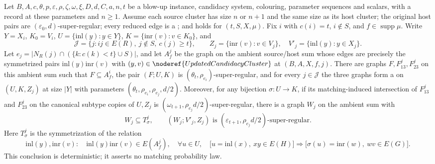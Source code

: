 \begin{lemma}
Let $B,A,c,\theta,p,\varepsilon,\rho,\zeta,\omega,\xi,D,d,C,a,n,t$
be a blow-up instance, candidacy system, colouring, parameter sequences and
scalars, with a  record at these parameters
and $n\ge1$. Assume each source cluster has size $n$ or $n+1$ and the same
size as its host cluster; the original host pairs are
$(\varepsilon_0,d)$-super-regular; every reduced edge is a
; and
 holds for $(t,S,X,\mu)$.
Fix $i$ with $c(i)=t$, $i\notin S$, and $f\in\operatorname{supp}\mu$.
Write $Y=X_i$, $K_0=V_i$, $U=\{\mathrm{inl}(y):y\in Y\}$,
$K=\{\mathrm{inr}(v):v\in K_0\}$, and
\[
 \mathcal J=\{j:ij\in E(R),\ j\notin S,\ c(j)\ge t\},\qquad
 Z_j=\{\mathrm{inr}(v):v\in V_j\},\quad
 V'_j=\{\mathrm{inl}(y):y\in X_j\}.
\]
Let $e_j=|N_R(j)\cap(\{k:c(k)<t\}\cup S)|$, and let $A_f^j$ be
the graph on the ambient source/host sum whose edges are precisely the
symmetrized pairs $\mathrm{inl}(y)\mathrm{inr}(v)$ with
$(y,v)\in\noderef{UpdatedCandidacyCluster}$ at $(B,A,X,f,j)$.
There are graphs $F,F_{13}^j,F_{23}^j$ on this ambient sum such that
$F\subseteq A_f^i$, the pair $(F;U,K)$ is
$(\theta_t,\rho_{e_i})$-super-regular, and for every $j\in\mathcal J$
the three graphs form a  on
$(U,K,Z_j)$ at size $|Y|$ with parameters
$(\theta_t,\rho_{e_i},\rho_{e_j},d/2)$.
Moreover, for any bijection $\sigma:U\to K$, if its matching-induced
intersection of $F_{13}^j$ and $F_{23}^j$ on the canonical subtype copies
of $U,Z_j$ is $(\omega_{t+1},\rho_{e_j}d/2)$-super-regular, there is a graph
$W_j$ on the ambient sum with
\[
 W_j\subseteq T^j_\sigma,\qquad
 (W_j;V'_j,Z_j)\text{ is }(\varepsilon_{t+1},\rho_{e_j}d/2)
 \text{-super-regular}.
\]
Here $T^j_\sigma$ is the symmetrization of the relation
\[
 \mathrm{inl}(y),\mathrm{inr}(v):\quad
 \mathrm{inl}(y)\mathrm{inr}(v)\in E(A_f^j),\quad
 \forall u\in U,\quad
 \bigl[u=\mathrm{inl}(x),\ xy\in E(H)\bigr]
 \Longrightarrow
 \bigl[\sigma(u)=\mathrm{inr}(w),\ wv\in E(G)\bigr].
\]
This conclusion is deterministic; it asserts no matching probability law.
\end{lemma}
